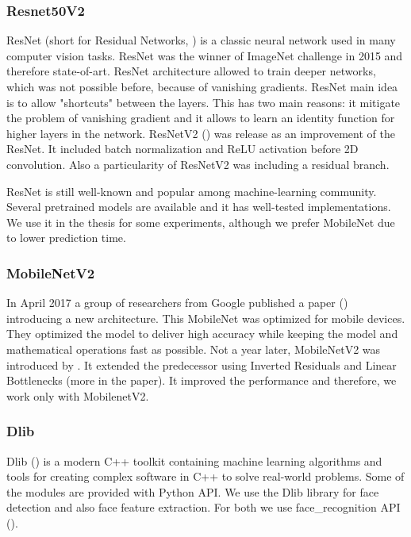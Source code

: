 \subsubsection*{Resnet50V2}

ResNet (short for Residual Networks, \cite{resnet}) is a classic neural network used in many computer vision tasks. ResNet was the winner of ImageNet challenge in 2015 and therefore state-of-art. ResNet architecture allowed to train deeper networks, which was not possible before, because of vanishing gradients. ResNet main idea is to allow "shortcuts" between the layers. This has two main reasons: it mitigate the problem of vanishing gradient and it allows to learn an identity  function for higher layers in the network. ResNetV2 (\cite{resnetv2}) was release as an improvement of the ResNet. It included batch normalization and ReLU activation before 2D convolution. Also a particularity of ResNetV2 was including a residual branch.

ResNet is still well-known and popular among machine-learning community. Several pretrained models are available and it has well-tested implementations. We use it in the thesis for some experiments, although we prefer MobileNet due to lower prediction time.

\subsubsection*{MobileNetV2}

In April 2017 a group of researchers from Google published a paper (\cite{mobilenet}) introducing a new architecture. This MobileNet was optimized for mobile devices. They optimized the model to deliver high accuracy while keeping the model and mathematical operations fast as possible. Not a year later, MobileNetV2 was introduced by \cite{mobilenetv2}. It extended the predecessor using Inverted Residuals and Linear Bottlenecks (more in the paper). It improved the performance and therefore, we work only with MobilenetV2.


\subsubsection{Dlib}
Dlib (\cite{king2009dlib}) is a modern C++ toolkit containing machine learning algorithms and tools for creating complex software in C++ to solve real-world problems. Some of the modules are provided with Python API. We use the Dlib library for face detection and also face feature extraction. For both we use face\_recognition API (\cite{geitgey2016machine}). \cite{king2017high} 





